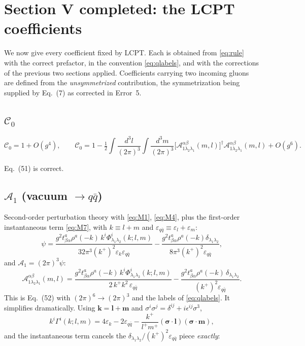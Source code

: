 \documentclass[11pt]{article}
\newcommand{\eps}{\varepsilon}
\newcommand{\dg}{\dagger}
\newcommand{\ip}[1]{\int\!\frac{d^{3}#1}{(2\pi)^{3}}}
\newcommand{\half}{\tfrac12}
\newcommand{\Gam}{\Gamma}
\newcommand{\Ph}{\Phi}
\begin{document}
\section{Section V completed: the LCPT coefficients}
\label{sec:V}

We now give every coefficient fixed by LCPT. Each is obtained from \eqref{eq:rule} with the
correct prefactor, in the convention \eqref{eq:qlabels}, and with the corrections of the previous
two sections applied. Coefficients carrying two incoming gluons are defined from the
\emph{unsymmetrized} contribution, the symmetrization being supplied by Eq.~(7) as corrected in
Error~5.

\subsection{$\mathcal C_0$}
\begin{res}
\begin{equation}
\mathcal C_{0}=1+O(g^{4}),\qquad
\mathcal C_{0}=1-\half\ip{l}\ip{m}
\big[\mathcal A^{\alpha\beta}_{1\lambda_2\lambda_1}(m,l)\big]^{\dg}
\mathcal A^{\alpha\beta}_{1\lambda_2\lambda_1}(m,l)+O(g^{6}).
\end{equation}
\end{res}
\noindent Eq.~(51) is correct.

\subsection{$\mathcal A_1$ (vacuum $\to q\bar q$)}

Second-order perturbation theory with \eqref{eq:M1}, \eqref{eq:M4}, plus the first-order
instantaneous term \eqref{eq:M7}, with $k\equiv l+m$ and $\eps_{q\bar q}\equiv\eps_{l}+\eps_{m}$:
\begin{equation}
\psi=\frac{g^{2}t^{a}_{\beta\alpha}\rho^{a}(-k)\,k^{i}\Ph^{i}_{\lambda_1\lambda_2}(k;l,m)}
{32\pi^{3}(k^{+})^{2}\eps_{k}\eps_{q\bar q}}
-\frac{g^{2}t^{a}_{\beta\alpha}\rho^{a}(-k)\delta_{\lambda_1\lambda_2}}
{8\pi^{3}(k^{+})^{2}\eps_{q\bar q}},
\end{equation}
and $\mathcal A_{1}=(2\pi)^{3}\psi$:
\begin{equation}
\mathcal A^{\alpha\beta}_{1\lambda_2\lambda_1}(m,l)=
\frac{g^{2}t^{a}_{\beta\alpha}\rho^{a}(-k)\,k^{i}\Ph^{i}_{\lambda_1\lambda_2}(k;l,m)}
{2\,k^{+}k^{2}\,\eps_{q\bar q}}
-\frac{g^{2}t^{a}_{\beta\alpha}\rho^{a}(-k)\,\delta_{\lambda_1\lambda_2}}{(k^{+})^{2}\eps_{q\bar q}} .
\label{eq:A1raw}
\end{equation}
This is Eq.~(52) with $(2\pi)^{6}\to(2\pi)^{3}$ and the labels of \eqref{eq:qlabels}. It
simplifies dramatically. Using $\bm k=\bm l+\bm m$ and $\sigma^{i}\sigma^{j}=\delta^{ij}
+i\epsilon^{ij}\sigma^{3}$,
\begin{equation}
k^{i}\Gam^{i}(k;l,m)=4\eps_{k}-2\eps_{q\bar q}
-\frac{k^{+}}{l^{+}m^{+}}(\bm\sigma\!\cdot\!\bm l)(\bm\sigma\!\cdot\!\bm m),
\end{equation}
and the instantaneous term cancels the $\delta_{\lambda_1\lambda_2}/(k^{+})^{2}\eps_{q\bar q}$
piece \emph{exactly}:
\end{document}
